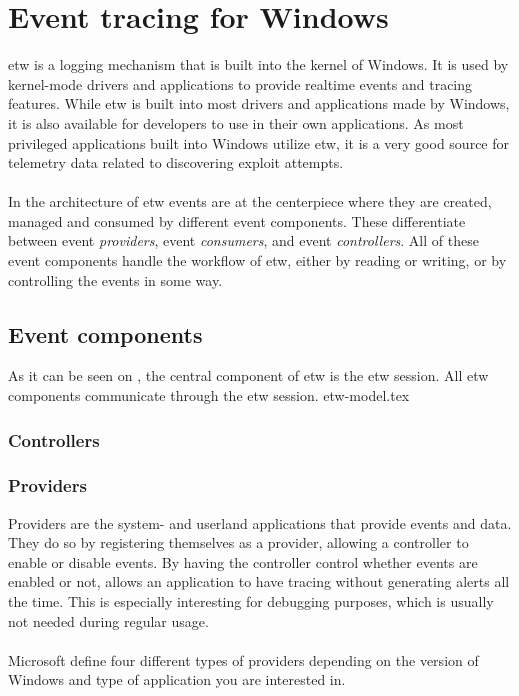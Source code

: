 \documentclass{report}
\begin{document}
\section{Event tracing for Windows}
\label{cha:etw}
\gls{etw} is a logging mechanism that is built into the kernel of Windows. It is used by kernel-mode drivers and applications to provide realtime events and tracing features. While \gls{etw} is built into most drivers and applications made by Windows, it is also available for developers to use in their own applications. As most privileged applications built into Windows utilize \gls{etw}, it is a very good source for telemetry data related to discovering exploit attempts.
\\
\\
In the architecture of \gls{etw} events are at the centerpiece where they are created, managed and consumed by different event components\cite{url:etw:about}. These differentiate between event \emph{providers}, event \emph{consumers}, and event \emph{controllers}. All of these event components handle the workflow of \gls{etw}, either by reading or writing, or by controlling the events in some way.

\subsection{Event components}
As it can be seen on , the central component of \gls{etw} is the \gls{etw} session. All \gls{etw} components communicate through the \gls{etw} session.
{etw-model.tex}
\subsubsection{Controllers}
\subsubsection{Providers}
Providers are the system- and userland applications that provide events and data. They do so by registering themselves as a provider, allowing a controller to enable or disable events. By having the controller control whether events are enabled or not, allows an application to have tracing without generating alerts all the time. This is especially interesting for debugging purposes, which is usually not needed during regular usage.
\\
\\
Microsoft define four different types of providers depending on the version of Windows and type of application you are interested in.
\end{document}
